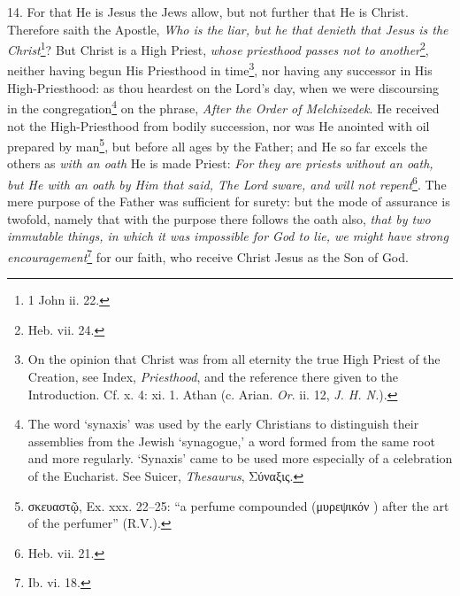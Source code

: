 14. For that He is Jesus the Jews allow, but not further that He is Christ. Therefore saith the Apostle, \emph{Who is the liar, but he that denieth that Jesus is the Christ}\footnote{1 John ii. 22.}? But Christ is a High Priest, \emph{whose priesthood passes not to another}\footnote{Heb. vii. 24.}, neither having begun His Priesthood in time\footnote{On the opinion that Christ was from all eternity the true High Priest of the Creation, see Index, \emph{Priesthood}, and the reference there given to the Introduction. Cf. x. 4: xi. 1. Athan (c. Arian. \emph{Or}. ii. 12, \emph{J. H. N.}).}, nor having any successor in His High-Priesthood: as thou heardest on the Lord’s day, when we were discoursing in the congregation\footnote{The word ‘synaxis’ was used by the early Christians to distinguish their assemblies from the Jewish ‘synagogue,’ a word formed from the same root and more regularly. ‘Synaxis’ came to be used more especially of a celebration of the Eucharist. See Suicer, \emph{Thesaurus}, \textgreek{Σύναξις}.} on the phrase, \emph{After the Order of Melchizedek}. He received not the High-Priesthood from bodily succession, nor was He anointed with oil prepared by man\footnote{\textgreek{σκευαστῷ}, Ex. xxx. 22–25: “a perfume compounded (\textgreek{μυρεψικόν} ) after the art of the perfumer” (\textsc{R.V.}).}, but before all ages by the Father; and He so far excels the others as \emph{with an oath} He is made Priest: \emph{For they are priests without an oath, but He with an oath by Him that said, The Lord sware, and will not repent}\footnote{Heb. vii. 21.}. The mere purpose of the Father was sufficient for surety: but the mode of assurance is twofold, namely that with the purpose there follows the oath also, \emph{that by two immutable things, in which it was impossible for God to lie, we might have strong encouragement}\footnote{Ib. vi. 18.} for our faith, who receive Christ Jesus as the Son of God.

